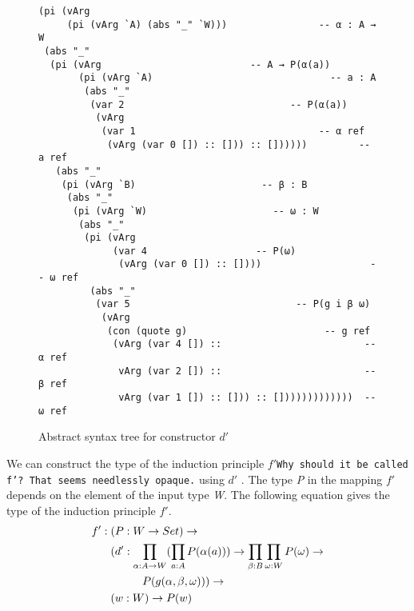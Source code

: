 \documentclass[sigplan,10pt]{acmart}
\begin{document}
\begin{figure}
\begin{center}
\begingroup
\fontsize{7pt}{9pt}\selectfont
\begin{Verbatim}[frame = single]
(pi (vArg
     (pi (vArg `A) (abs "_" `W)))                -- α : A → W
 (abs "_"
  (pi (vArg                          -- A → P(α(a))
       (pi (vArg `A)                               -- a : A
        (abs "_"
         (var 2                             -- P(α(a))
          (vArg
           (var 1                                -- α ref
            (vArg (var 0 []) :: [])) :: [])))))         -- a ref
   (abs "_"
    (pi (vArg `B)                      -- β : B
     (abs "_"
      (pi (vArg `W)                      -- ω : W
       (abs "_"
        (pi (vArg
             (var 4                   -- P(ω)
              (vArg (var 0 []) :: [])))                   -- ω ref
         (abs "_"
          (var 5                             -- P(g i β ω)
           (vArg
            (con (quote g)                        -- g ref
             (vArg (var 4 []) ::                         -- α ref
              vArg (var 2 []) ::                         -- β ref
              vArg (var 1 []) :: [])) :: []))))))))))))  -- ω ref
\end{Verbatim}
\endgroup
\end{center}
\caption{Abstract syntax tree for constructor $d'$}
\label{fig:ast-d'}
\end{figure}

\normalsize

We can construct the type of the induction principle $f'$\texttt{Why should it be called f'? That seems needlessly opaque.} using $d'$ . The type \emph{P}  in the mapping $f'$ depends on the element of the input type \emph{W}. The following equation gives the type of the induction principle $f'$.
\begin{align}
& f' : (P : W \rightarrow Set) \rightarrow \nonumber \\
& \hspace {0.6cm} (d' : \prod_{\alpha : A \rightarrow W} (\prod_{a : A} P(\alpha (a))) \rightarrow \prod_{\beta : B} \prod_{\omega : W} P(\omega) \rightarrow \nonumber \\
& \hspace {1.6cm} P (g(\alpha, \beta, \omega))) \rightarrow \nonumber \\
& \hspace {0.6cm} (w : W) \rightarrow P (w) \nonumber
\end{align}
\end{document}
